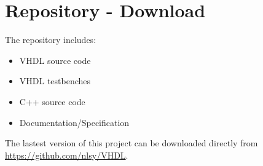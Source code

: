 \documentclass[12pt,a4 paper] {report}
\begin{document}
\newpage

\chapter{Repository - Download}
The repository includes:
\begin{itemize}
	\item VHDL source code
	\item VHDL testbenches
	\item C++ source code
	\item Documentation/Specification
\end{itemize}
The lastest version of this project can be downloaded directly from \href{https://github.com/nlsy/VHDL}{https://github.com/nlsy/VHDL}. \\
\end{document}
